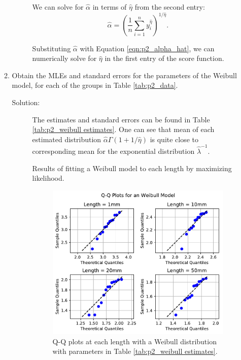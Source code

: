 \documentclass[letterpaper,11pt]{article}
\begin{document}
\begin{enumerate}
\begin{enumerate}
\begin{description}
    We can solve for $\hat{\alpha}$ in terms of $\hat{\eta}$ from the second
    entry:
    \begin{equation}
      \hat{\alpha} = \left(\frac{1}{n}\sum_{i=1}^n y_i^{\hat{\eta}}\right)^{1/\hat{\eta}}.
      \label{eqn:p2_alpha_hat}
    \end{equation}

    Substituting $\hat{\alpha}$ with Equation \ref{eqn:p2_alpha_hat}, we can
    numerically solve for $\hat{\eta}$ in the first entry of the score function.
  \end{description}
\item Obtain the MLEs and standard errors for the parameters of the Weibull
  model, for each of the groups in Table \ref{tab:p2_data}.
  \begin{description}
  \item[Solution:] The estimates and standard errors can be found in Table
    \ref{tab:p2_weibull estimates}. One can see that mean of each estimated
    distribution $\hat{\alpha}\Gamma\left(1 + 1/\hat{\eta}\right)$ is quite
    close to corresponding mean for the exponential distribution
    $\hat{\lambda}^{-1}$.

    \begin{table}
      \centering 
      \caption{Results of fitting a Weibull model to each length by maximizing
        likelihood.}
      \label{tab:p2_weibull estimates}
    \end{table}

    \begin{figure}
      \centering
      \includegraphics{p2_qq_weibull.pdf}
      \caption{Q-Q plots at each length with a Weibull distribution with
        parameters in Table \ref{tab:p2_weibull estimates}.}
      \label{fig:p2_qq_weibull}
    \end{figure}


\end{description}
\end{enumerate}
\end{enumerate}
\end{document}
